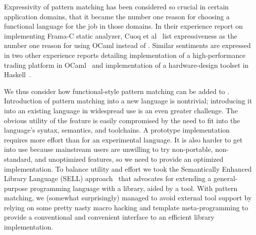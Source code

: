 Expressivity of pattern matching has been considered so crucial in certain application domains, 
that it became the number one reason for choosing a functional language for the 
job in those domains. In their experience report on implementing Frama-C static 
analyzer, Cuoq et al~\cite{FramaC09} list expressiveness as the number one reason for using 
OCaml instead of \Cpp{}. Similar sentiments are expressed in 
two other experience reports detailing implementation of a high-performance 
trading platform in OCaml~\cite{Minsky08} and implementation of a hardware-design 
toolset in Haskell~\cite{Nanavati08}.

We thus consider how functional-style pattern matching can be added to \Cpp{}.
Introduction of pattern matching into a new language is nontrivial;
introducing it into an existing language in widespread use is an even greater 
challenge. The obvious utility of the feature is easily compromised by the need 
to fit into the language's syntax, semantics, and toolchains. A prototype 
implementation requires more effort than for an experimental language.
It is also
harder to get into use because mainstream users are unwilling to try 
non-portable, non-standard, and unoptimized features, so we need to provide an optimized implementation. 
To balance utility and effort we took the Semantically Enhanced Library Language 
(SELL) approach~\cite{SELL,BSGDR05} that advocates for extending a general-purpose 
programming language with a library, aided by a tool. With pattern matching, we 
(somewhat surprisingly) managed to avoid external tool support by relying on 
some pretty nasty macro hacking and template meta-programming to provide a 
conventional and convenient interface to an efficient library implementation.


